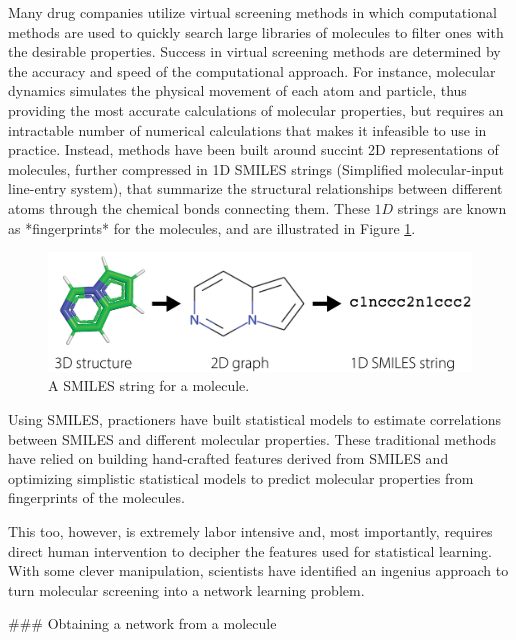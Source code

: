 Many drug companies utilize virtual screening methods in which computational methods are used to quickly search large libraries of molecules to filter ones with the desirable properties. Success in virtual screening methods are determined by the accuracy and speed of the computational approach. For instance, molecular dynamics simulates the physical movement of each atom and particle, thus providing the most accurate calculations of molecular properties, but requires an intractable number of numerical calculations that makes it infeasible to use in practice. Instead, methods have been built around succint 2D representations of molecules, further compressed in 1D SMILES  \cite{Weininger1988Feb,Weininger1989May,Weininger1990Aug} strings (Simplified molecular-input line-entry system), that summarize the structural relationships between different atoms through the chemical bonds connecting them. These $1D$ strings are known as *fingerprints* for the molecules, and are illustrated in Figure \ref{fig:next:smiles}.

\begin{figure}
    \centering
    \includegraphics[width=\linewidth]{next/Images/molecule_repr.png}
    \caption[SMILES string for a molecule]{A SMILES string for a molecule.}
    \label{fig:next:smiles}
\end{figure}

Using SMILES, practioners have built statistical models to estimate correlations between SMILES and different molecular properties. These traditional methods have relied on building hand-crafted features derived from SMILES and optimizing simplistic statistical models to predict molecular properties from fingerprints of the molecules. 

This too, however, is extremely labor intensive and, most importantly, requires direct human intervention to decipher the features used for statistical learning. With some clever manipulation, scientists have identified an ingenius approach to turn molecular screening into a network learning problem.

### Obtaining a network from a molecule

